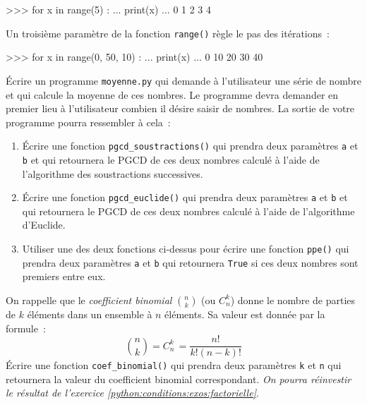 \begin{pythoncode}
>>> for x in range(5) :
...   print(x)
...
0
1
2
3
4
\end{pythoncode}

Un troisième paramètre de la fonction \texttt{range()} règle le pas des itérations~:

\begin{pythoncode}
>>> for x in range(0, 50, 10) :
...    print(x)
...
0
10
20
30
40
\end{pythoncode}


\begin{exercice}
Écrire un programme \texttt{moyenne.py} qui demande à l'utilisateur une série de nombre
et qui calcule la moyenne de ces nombres. Le programme devra demander en premier lieu à
l'utilisateur combien il désire saisir de nombres.
La sortie de votre programme pourra ressembler à cela~:
\end{exercice}


\begin{exercice}
\begin{enumerate}
	\item Écrire une fonction \texttt{pgcd\_soustractions()} qui prendra deux paramètres \texttt{a} et
	\texttt{b} et qui retournera le PGCD de ces deux nombres calculé à l'aide de l'algorithme des
	soustractions successives.
	\item Écrire une fonction \texttt{pgcd\_euclide()} qui prendra deux paramètres \texttt{a} et
	\texttt{b} et qui retournera le PGCD de ces deux nombres calculé à l'aide de l'algorithme
	d'Euclide.
	\item Utiliser une des deux fonctions ci-dessus pour écrire une fonction \texttt{ppe()} qui
	prendra deux paramètres \texttt{a} et \texttt{b} qui retournera \texttt{True} si ces deux
	nombres sont premiers entre eux.
\end{enumerate}
\end{exercice}

\begin{exercice}
On rappelle que le \textit{coefficient binomial} $n \choose k$ (ou $C_n^k$) donne le nombre
de parties de $k$ éléments dans un ensemble à $n$ éléments. Sa valeur est donnée par la formule~:
\[{n \choose k} = C_n^k\, = \frac{n!}{k!(n-k)!}\]
Écrire une fonction \texttt{coef\_binomial()} qui prendra deux paramètres
\texttt{k} et \texttt{n} qui retournera la valeur du coefficient binomial correspondant.
\textit{On pourra réinvestir le résultat de l'exercice \ref{python:conditions:exos:factorielle}}.
\end{exercice}

